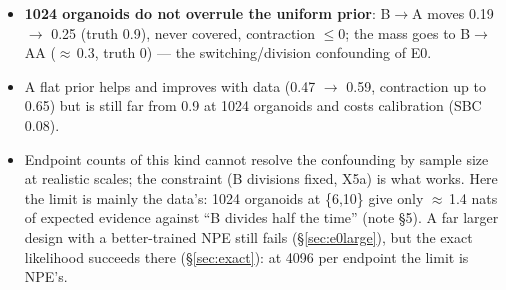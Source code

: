 \documentclass[10pt,a4paper]{article}
\begin{document}
\begin{itemize}
\item \textbf{1024 organoids do not overrule the uniform prior}: B$\to$A moves 0.19 $\to$ 0.25 (truth 0.9), never covered, contraction $\le 0$; the mass goes to B$\to$AA ($\approx$\,0.3, truth 0) --- the switching/division confounding of E0.
\item A flat prior helps and improves with data (0.47 $\to$ 0.59, contraction up to 0.65) but is still far from 0.9 at 1024 organoids and costs calibration (SBC 0.08).
\item Endpoint counts of this kind cannot resolve the confounding by sample size at realistic scales; the constraint (B divisions fixed, X5a) is what works. Here the limit is mainly the data's: 1024 organoids at \{6,10\} give only $\approx$\,1.4 nats of expected evidence against ``B divides half the time'' (note \S5). A far larger design with a better-trained NPE still fails (\S\ref{sec:e0large}), but the exact likelihood succeeds there (\S\ref{sec:exact}): at 4096 per endpoint the limit is NPE's.
\end{itemize}

\end{document}
